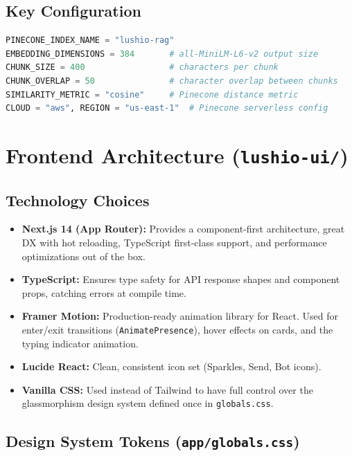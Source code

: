 \documentclass[12pt]{article}
\begin{document}
\subsection{Key Configuration}
\begin{lstlisting}[language=Python]
PINECONE_INDEX_NAME = "lushio-rag"
EMBEDDING_DIMENSIONS = 384       # all-MiniLM-L6-v2 output size
CHUNK_SIZE = 400                 # characters per chunk
CHUNK_OVERLAP = 50               # character overlap between chunks
SIMILARITY_METRIC = "cosine"     # Pinecone distance metric
CLOUD = "aws", REGION = "us-east-1"  # Pinecone serverless config
\end{lstlisting}

\section{Frontend Architecture (\texttt{lushio-ui/})}

\subsection{Technology Choices}
\begin{itemize}[leftmargin=1.5em]
    \item \textbf{Next.js 14 (App Router):} Provides a component-first architecture, great DX with hot reloading, TypeScript first-class support, and performance optimizations out of the box.
    \item \textbf{TypeScript:} Ensures type safety for API response shapes and component props, catching errors at compile time.
    \item \textbf{Framer Motion:} Production-ready animation library for React. Used for enter/exit transitions (\texttt{AnimatePresence}), hover effects on cards, and the typing indicator animation.
    \item \textbf{Lucide React:} Clean, consistent icon set (Sparkles, Send, Bot icons).
    \item \textbf{Vanilla CSS:} Used instead of Tailwind to have full control over the glassmorphism design system defined once in \texttt{globals.css}.
\end{itemize}

\subsection{Design System Tokens (\texttt{app/globals.css})}
\end{document}
